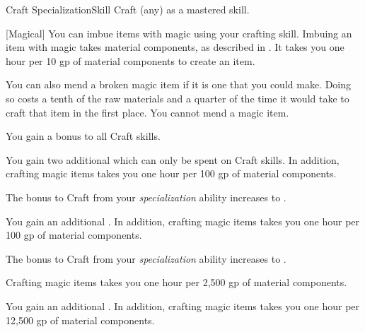     \begin{feat}{Craft Specialization}{Skill}
        \featpre Craft (any) as a mastered skill.

        [Magical] You can imbue items with magic using your crafting skill.
        Imbuing an item with magic takes material components, as described in .
        It takes you one hour per 10 gp of material components to create an item.

        You can also mend a broken magic item if it is one that you could make.
        Doing so costs a tenth of the raw materials and a quarter of the time it would take to craft that item in the first place.
        You cannot mend a  magic item.

         You gain a  bonus to all Craft skills.

         You gain two additional  which can only be spent on Craft skills.
        In addition, crafting magic items takes you one hour per 100 gp of material components.

         The bonus to Craft from your \textit{specialization} ability increases to .

         You gain an additional .
        In addition, crafting magic items takes you one hour per 100 gp of material components.

         The bonus to Craft from your \textit{specialization} ability increases to .

        \ff[17]{}
        Crafting magic items takes you one hour per 2,500 gp of material components.

         You gain an additional .
        In addition, crafting magic items takes you one hour per 12,500 gp of material components.
    \end{feat}


